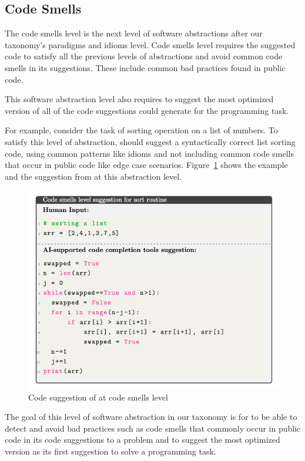 \subsection{Code Smells}
The code smells level is the next level of software abstractions after our taxonomy's paradigms and idioms level. 
Code smells level requires the suggested code to satisfy all the previous levels of abstractions and avoid common code smells in its suggestions. These include common bad practices found in public code. 

This software abstraction level also requires \cct{} to suggest the most optimized version of all of the code suggestions \cct{} could generate for the programming task.

For example, consider the task of sorting operation on a list of numbers. To satisfy this level of abstraction, \cct{} should suggest a syntactically correct list sorting code, using common patterns like idioms and not including common code smells that occur in public code like edge case scenarios. 
Figure~\ref{fig:smells} shows the example and the suggestion from \cct{} at this abstraction level.

\begin{figure}[hbt!]
    \centering
    \includegraphics[width=\linewidth]{Figures/smells.png}
    \caption{Code suggestion of \cct{} at code smells level}
    \label{fig:smells}
\end{figure}

The goal of this level of software abstraction in our taxonomy is for \cct{} to be able to detect and avoid bad practices such as code smells that commonly occur in public code in its code suggestions to a problem and to suggest the most optimized version as its first suggestion to solve a programming task.

